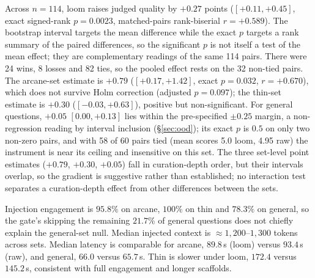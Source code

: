 \documentclass[10pt,twocolumn]{article}
\begin{document}
Across $n=114$, loom raises judged quality by $\mathbf{+0.27}$ points ($[+0.11,+0.45]$, exact signed-rank $p=0.0023$, matched-pairs rank-biserial $r=+0.589$). The bootstrap interval targets the mean difference while the exact $p$ targets a rank summary of the paired differences, so the significant $p$ is not itself a test of the mean effect; they are complementary readings of the same 114 pairs. There were 24 wins, 8 losses and 82 ties, so the pooled effect rests on the 32 non-tied pairs. The arcane-set estimate is $+0.79$ ($[+0.17,+1.42]$, exact $p=0.032$, $r=+0.670$), which does not survive Holm correction (adjusted $p=0.097$); the thin-set estimate is $+0.30$ ($[-0.03,+0.63]$), positive but non-significant. For general questions, $+0.05$ $[0.00,+0.13]$ lies within the pre-specified $\pm0.25$ margin, a non-regression reading by interval inclusion (\S\ref{sec:ood}); its exact $p$ is $0.5$ on only two non-zero pairs, and with 58 of 60 pairs tied (mean scores 5.0 loom, 4.95 raw) the instrument is near its ceiling and insensitive on this set. The three set-level point estimates ($+0.79$, $+0.30$, $+0.05$) fall in curation-depth order, but their intervals overlap, so the gradient is suggestive rather than established; no interaction test separates a curation-depth effect from other differences between the sets.

Injection engagement is $95.8\%$ on arcane, $100\%$ on thin and $78.3\%$ on general, so the gate's skipping the remaining $21.7\%$ of general questions does not chiefly explain the general-set null. Median injected context is $\approx1{,}200$--$1{,}300$ tokens across sets. Median latency is comparable for arcane, $89.8$\,s (loom) versus $93.4$\,s (raw), and general, $66.0$ versus $65.7$\,s. Thin is slower under loom, $172.4$ versus $145.2$\,s, consistent with full engagement and longer scaffolds.
\end{document}
